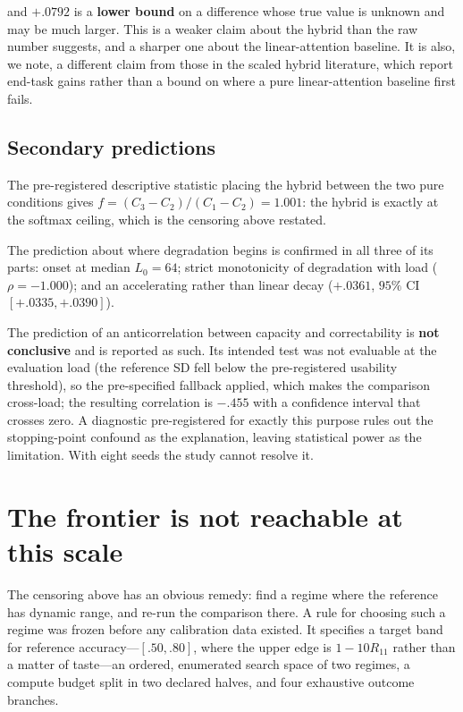 \documentclass[jou,11pt,donotrepeattitle]{apa7}
\begin{document}
and $+.0792$ is a \textbf{lower bound} on a difference whose true value is unknown and may be
much larger. This is a weaker claim about the hybrid than the raw number suggests, and a
sharper one about the linear-attention baseline. It is also, we note, a different claim from
those in the scaled hybrid literature, which report end-task gains rather than a bound on where
a pure linear-attention baseline first fails.

\subsection{Secondary predictions}

The pre-registered descriptive statistic placing the hybrid between the two pure conditions
gives $f = (C_3-C_2)/(C_1-C_2) = 1.001$: the hybrid is exactly at the softmax ceiling, which is
the censoring above restated.

The prediction about where degradation begins is confirmed in all three of its parts: onset at
median $L_0 = 64$; strict monotonicity of degradation with load ($\rho = -1.000$); and an
accelerating rather than linear decay ($+.0361$, $95\%$ CI $[+.0335, +.0390]$).

The prediction of an anticorrelation between capacity and correctability is \textbf{not
conclusive} and is reported as such. Its intended test was not evaluable at the evaluation load
(the reference SD fell below the pre-registered usability threshold), so the pre-specified
fallback applied, which makes the comparison cross-load; the resulting correlation is $-.455$
with a confidence interval that crosses zero. A diagnostic pre-registered for exactly this
purpose rules out the stopping-point confound as the explanation, leaving statistical power as
the limitation. With eight seeds the study cannot resolve it.

\section{The frontier is not reachable at this scale}

The censoring above has an obvious remedy: find a regime where the reference has dynamic range,
and re-run the comparison there. A rule for choosing such a regime was frozen before any
calibration data existed. It specifies a target band for reference accuracy---$[.50, .80]$,
where the upper edge is $1-10R_{11}$ rather than a matter of taste---an ordered, enumerated
search space of two regimes, a compute budget split in two declared halves, and four exhaustive
outcome branches.
\end{document}

